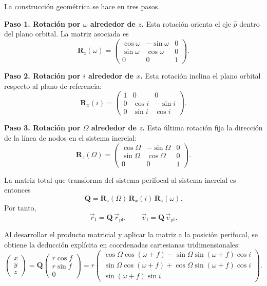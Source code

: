 La construcción geométrica se hace en tres pasos.

\textbf{Paso 1. Rotación por \(\omega\) alrededor de \(z\).}  
Esta rotación orienta el eje \(\hat{p}\) dentro del plano orbital. La matriz asociada es
\[
\mathbf{R}_z(\omega)=
\begin{pmatrix}
\cos\omega & -\sin\omega & 0 \\
\sin\omega & \cos\omega & 0 \\
0 & 0 & 1
\end{pmatrix}.
\]

\textbf{Paso 2. Rotación por \(i\) alrededor de \(x\).}  
Esta rotación inclina el plano orbital respecto al plano de referencia:
\[
\mathbf{R}_x(i)=
\begin{pmatrix}
1 & 0 & 0 \\
0 & \cos i & -\sin i \\
0 & \sin i & \cos i
\end{pmatrix}.
\]

\textbf{Paso 3. Rotación por \(\Omega\) alrededor de \(z\).}  
Esta última rotación fija la dirección de la línea de nodos en el sistema inercial:
\[
\mathbf{R}_z(\Omega)=
\begin{pmatrix}
\cos\Omega & -\sin\Omega & 0 \\
\sin\Omega & \cos\Omega & 0 \\
0 & 0 & 1
\end{pmatrix}.
\]

La matriz total que transforma del sistema perifocal al sistema inercial es entonces
\[
\mathbf{Q} = \mathbf{R}_z(\Omega)\,\mathbf{R}_x(i)\,\mathbf{R}_z(\omega).
\]
Por tanto,
\[
\vec{r}_{\mathrm{I}} = \mathbf{Q}\,\vec{r}_{\mathrm{pf}},
\qquad
\vec{v}_{\mathrm{I}} = \mathbf{Q}\,\vec{v}_{\mathrm{pf}}.
\]

Al desarrollar el producto matricial y aplicar la matriz a la posición perifocal, se obtiene la deducción explícita en coordenadas cartesianas tridimensionales:
\[
\begin{pmatrix}
 x \\
 y \\
 z
\end{pmatrix}
=
\mathbf{Q}
\begin{pmatrix}
 r\cos f \\
 r\sin f \\
 0
\end{pmatrix}
=
 r
\begin{pmatrix}
 \cos\Omega\cos(\omega+f)-\sin\Omega\sin(\omega+f)\cos i \\
 \sin\Omega\cos(\omega+f)+\cos\Omega\sin(\omega+f)\cos i \\
 \sin(\omega+f)\sin i
\end{pmatrix}.
\]

